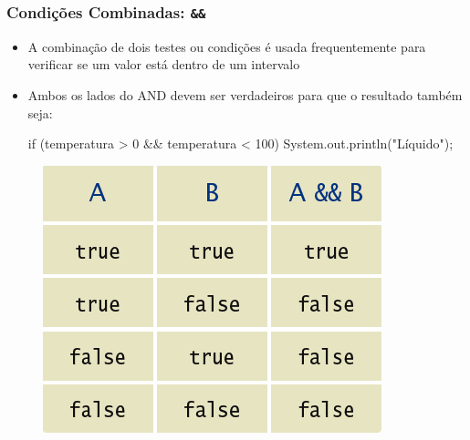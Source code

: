 \documentclass[xcolor={dvipsnames,table},aspectratio=169]{beamer}
\begin{document}
\begin{frame}[fragile]\frametitle{Condições Combinadas: \texttt{\&\&}}
\begin{itemize}
	\item A combinação de dois testes ou condições é usada frequentemente para verificar se um valor está dentro de um intervalo
	\item Ambos os lados do AND devem ser verdadeiros para que o resultado também seja:
{\scriptsize
\begin{javacode}
if (temperatura > 0 && temperatura < 100) {
   System.out.println("Líquido"); 
}
\end{javacode}
}
\end{itemize}
\begin{figure}[h]
	\includegraphics[height=0.35\paperheight,center]{pucrs-ep-fprog-unidade_03-decisoes-laminas-and.png}
\end{figure}
\end{frame}
\end{document}

